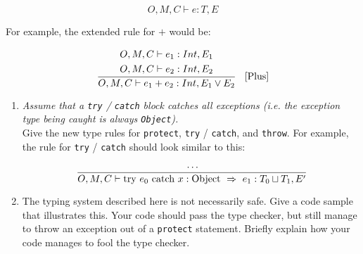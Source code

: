 \documentclass[12pt]{article} \usepackage{color} \usepackage{amsmath} \usepackage{amssymb}
\begin{document}
\begin{enumerate}
{$$
O,M,C \vdash e : T, E
$$

For example, the extended rule for $+$ would be:

$$
\cfrac{
\begin{aligned}
O,M,C & \vdash e_1 : Int, E_1 \\
O,M,C & \vdash e_2 : Int, E_2
\end{aligned}}
{O,M,C \vdash e_1 + e_2 : Int , E_1 \vee E_2 }
\quad \text{[Plus]}
$$

\begin{enumerate}
\item{\emph{Assume that a \texttt{try} / \texttt{catch} block catches all
exceptions (i.e. the exception type being caught is always
\texttt{Object}).}
\\

Give the new type rules for \texttt{protect}, \texttt{try} /
\texttt{catch}, and \texttt{throw}. For example, the rule for
\texttt{try} / \texttt{catch} should look similar to this:
$$
\cfrac{
\ldots
}
{O, M, C \vdash \text{try} \ e_0 \ \text{catch} \ x : \text{Object} \  \Rightarrow \ e_1 : T_0 \sqcup T_1, E'}
$$
 }
\item{The typing system described here is not necessarily safe. Give a
code sample that illustrates this. Your code should pass the type
checker, but still manage to throw an exception out of a
\texttt{protect} statement. Briefly explain how your code manages to
fool the type checker.}
\end{enumerate}
}
\end{enumerate}
\end{document}
